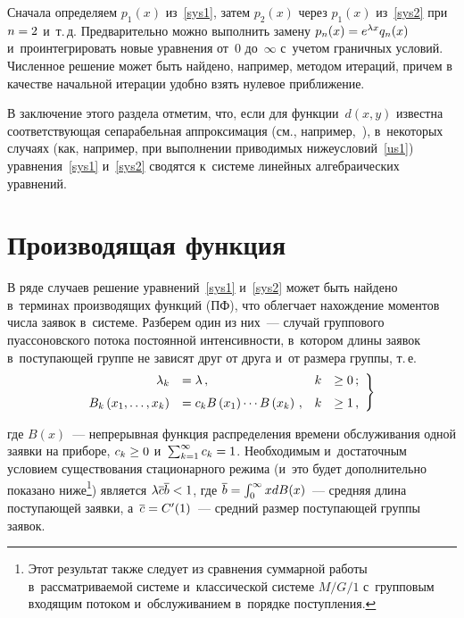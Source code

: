 \begin{multicols}{2}
 Сначала определяем
$p_1(x)$ из~\eqref{sys1}, затем $p_2(x)$ через $p_1(x)$ из~\eqref{sys2} 
при $n\hm=2$ и~т.\,д.
Предварительно можно выполнить замену \mbox{$p_n(x) \hm= e^{\lambda x} q_n(x)$}
и~проинтегрировать новые уравнения от~0 до~$\infty$ с~учетом граничных условий.
Чис\-лен\-ное решение может быть найдено, например, методом итераций, причем
в качестве начальной итерации удобно взять нулевое приближение.

В заключение этого раздела отметим,
что, если для функции~$d(x,y)$ известна соответству\-ющая
сепарабельная аппроксимация (см., например,~\cite{n5,n6,n7,n8}), 
в~некоторых случаях (как, например, при выполнении приводимых ниже\linebreak условий~\eqref{us1})
уравнения~\eqref{sys1} и~\eqref{sys2} сводятся к~сис\-те\-ме линейных алгебраических 
уравнений.

\section{Производящая функция}

В ряде случаев решение уравнений~\eqref{sys1} и~\eqref{sys2} может быть
найдено в~терминах производящих функций (ПФ), что облегчает нахождение моментов\linebreak
чис\-ла заявок в~сис\-те\-ме.
Разберем один из них~--- случай группового пуассоновского потока постоянной
интенсивности, в~котором длины заявок в~по\-сту\-па\-ющей
группе не зависят друг от друга и~от размера группы, т.\,е.
\begin{equation}
\left.
\begin{array}{rlrl}
\hspace*{-2mm}\lambda_k&=\lambda\,, & k&\ge 0\,;\\[6pt]
\hspace*{-2mm}B_k\left(x_1,\ld,x_k\right)&=
c_k B\left(x_1\right)\cdots B\left(x_k\right)\,, &
k &\ge 1\,,
\end{array}
\right\}
\label{us1}
\end{equation}

\noindent где $B(x)$~--- непрерывная функция распределения времени обслуживания
одной заявки на приборе, $c_k \hm\ge 0$ и~$\sum\nolimits_{k=1}^\infty c_k\hm=1$.
Необходимым и~достаточным условием существования стационарного режима 
(и~это будет дополнительно показано ниже\footnote{Этот результат  
также следует из сравнения суммарной работы в~рассматриваемой системе и~классической 
системе $M/G/1$ с~групповым входящим потоком и~обслуживанием в~порядке поступления.})
является $\lambda \overline{c}  \overline{b}\hm < 1$,
где $\overline{b}\hm=\int\nolimits_0^\infty x  dB(x)$~--- 
средняя длина поступающей заявки, а~$\overline{c}\hm=C'(1)$~--- 
средний размер поступающей группы заявок.



\end{multicols}
